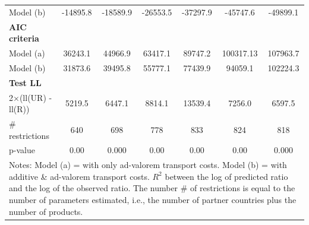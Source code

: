 \documentclass[a4paper,11pt]{article}
\begin{document}
\begin{table}[htbp]
\begin{center}
{\begin{tabular}{l|cccccc}
Model (b) & \multicolumn{1}{c}{-14895.8} & \multicolumn{1}{c}{-18589.9} & \multicolumn{1}{c}{-26553.5} & \multicolumn{1}{c}{-37297.9} & \multicolumn{1}{c}{-45747.6} & \multicolumn{1}{c}{-49899.1}  \\
\textbf{AIC criteria} & \multicolumn{1}{c}{} & \multicolumn{1}{c}{} & \multicolumn{1}{c}{} &       & \multicolumn{1}{c}{}  \\
Model (a)& \multicolumn{1}{c}{36243.1} & \multicolumn{1}{c}{44966.9} & \multicolumn{1}{c}{63417.1} & \multicolumn{1}{c}{89747.2} & \multicolumn{1}{c}{100317.13} & \multicolumn{1}{c}{107963.7} \\
Model (b) & \multicolumn{1}{c}{31873.6} & \multicolumn{1}{c}{39495.8} & \multicolumn{1}{c}{55777.1} & \multicolumn{1}{c}{77439.9} & \multicolumn{1}{c}{94059.1} & \multicolumn{1}{c}{102224.3}  \\
\textbf{Test LL} &       &       &       &       &       &       \\
2$\times$(ll(UR) -ll(R)) & \multicolumn{1}{c}{5219.5} & \multicolumn{1}{c}{6447.1} & \multicolumn{1}{c}{8814.1} & \multicolumn{1}{c}{13539.4} & \multicolumn{1}{c}{7256.0} & \multicolumn{1}{c}{6597.5}  \\
\# restrictions  & \multicolumn{1}{c}{640} & \multicolumn{1}{c}{698} & \multicolumn{1}{c}{778} & \multicolumn{1}{c}{833} & \multicolumn{1}{c}{824} & \multicolumn{1}{c}{818}  \\
p-value & \multicolumn{1}{c}{0.00} & \multicolumn{1}{c}{0.000} & \multicolumn{1}{c}{0.00} & \multicolumn{1}{c}{0.00} & \multicolumn{1}{c}{0.00} & \multicolumn{1}{c}{0.000} \\
\hline\hline
\multicolumn{7}{l}{\parbox[l]{13cm}{ \vspace{7pt}\scriptsize{Notes: Model (a) = with only ad-valorem transport costs.
Model (b) = with additive \& ad-valorem
transport costs.
$R^{2}$ between the log of predicted ratio and the log of the observed ratio.
The number \# of restrictions is equal to the number of parameters estimated, i.e., the number of partner countries plus the number of products.}}}
\end{tabular}%
}
\end{center}
\end{table}%
\end{document}
